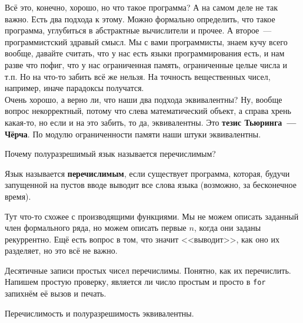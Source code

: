 \documentclass{article}
\begin{document}
    \begin{remark}
        Всё это, конечно, хорошо, но что такое программа? А на самом деле не так важно. Есть два подхода к этому. Можно формально определить, что такое программа, углубиться в абстрактные вычислители и прочее. А второе~--- программистский здравый смысл. Мы с вами программисты, знаем кучу всего вообще, давайте считать, что у нас есть языки программирования есть, и нам разве что пофиг, что у нас ограниченная память, ограниченные целые числа и т.п. Но на что-то забить всё же нельзя. На точность вещественных чисел, например, иначе парадоксы получатся.\\
        Очень хорошо, а верно ли, что наши два подхода эквивалентны? Ну, вообще вопрос некорректный, потому что слева математический объект, а справа хрень какая-то, но если и на это забить, то да, эквивалентны. Это \textbf{тезис Тьюринга~--- Чёрча}. По модулю ограниченности памяти наши штуки эквивалентны.
    \end{remark}
    \begin{remark}
        Почему полуразрешимый язык называется перечислимым?
    \end{remark}
    \begin{definition}
        Язык называется \textbf{перечислимым}, если существует программа, которая, будучи запущенной на пустов вводе выводит все слова языка (возможно, за бесконечное время).
    \end{definition}
    \begin{remark}
        Тут что-то схожее с производящими функциями. Мы не можем описать заданный член формального ряда, но можем описать первые $n$, когда они заданы рекуррентно. Ещё есть вопрос в том, что значит <<выводит>>, как оно их разделяет, но это всё не важно.
    \end{remark}
    \begin{example}
        Десятичные записи простых чисел перечислимы. Понятно, как их перечислить. Напишем простую проверку, является ли число простым и просто в \Verb|for| запихнём её вызов и печать.
    \end{example}
    \begin{theorem}
        Перечислимость и полуразрешимость эквивалентны.
    \end{theorem}
\end{document}
